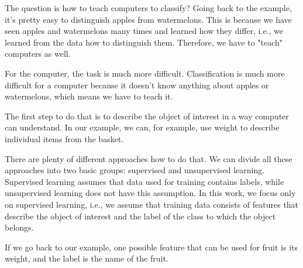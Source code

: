 The question is how to teach computers to classify? Going back to the example, it's pretty easy to distinguish apples from watermelons. This is because we have seen apples and watermelons many times and learned how they differ, i.e., we learned from the data how to distinguish them. Therefore, we have to "teach" computers as well. 

For the computer, the task is much more difficult. Classification is much more difficult for a computer because it doesn't know anything about apples or watermelons, which means we have to teach it. 


The first step to do that is to describe the object of interest in a way computer can understand. In our example, we can, for example, use weight to describe individual items from the basket.



There are plenty of different approaches how to do that. We can divide all these approaches into two basic groups: supervised and unsupervised learning. Supervised learning assumes that data used for training contains labels, while unsupervised learning does not have this assumption. In this work, we focus only on supervised learning, i.e., we assume that training data consists of features that describe the object of interest and the label of the class to which the object belongs.



If we go back to our example, one possible feature that can be used for fruit is its weight, and the label is the name of the fruit. 


